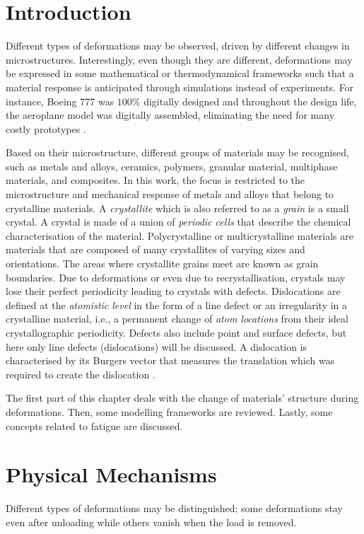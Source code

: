 \section{Introduction}
Different types of deformations may be observed, driven by different changes in microstructures. Interestingly, even though they are different, deformations may be expressed in some mathematical or thermodynamical frameworks such that a material response is anticipated through simulations instead of experiments. For instance, Boeing 777 was $100\%$ digitally designed and throughout the design life, the aeroplane model was digitally assembled, eliminating the need for many costly prototypes \parencite{Boeing777}.

Based on their microstructure, different groups of materials may be recognised, such as metals and alloys, ceramics, polymers, granular material, multiphase materials, and composites. In this work, the focus is restricted to the microstructure and mechanical response of metals and alloys that belong to crystalline materials. A \emph{crystallite} which is also referred to as a \emph{grain} is a small crystal. A crystal is made of a union of \emph{periodic cells} that describe the chemical characterisation of the material. Polycrystalline or multicrystalline materials are materials that are composed of many crystallites of varying sizes and orientations. The areas where crystallite grains meet are known as grain boundaries. Due to deformations or even due to recrystallisation, crystals may lose their perfect periodicity leading to crystals with defects. Dislocations are defined at the \emph{atomistic level} in the form of a line defect or an irregularity in a crystalline material, i.e., a permanent change of \emph{atom locations} from their ideal crystallographic periodicity. Defects also include point and surface defects, but here only line defects (dislocations) will be discussed. A dislocation is characterised by its Burgers vector that measures the translation which was required to create the dislocation \parencite{foll}.

The first part of this chapter deals with the change of materials' structure during deformations. Then, some modelling frameworks are reviewed. Lastly, some concepts related to fatigue are discussed.

\section{Physical Mechanisms}
Different types of deformations may be distinguished; some deformations stay even after unloading while others vanish when the load is removed.


